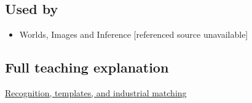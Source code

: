\subsection{Used by}\label{appendix-5fb4af80d1c7-used-by}

\begin{itemize}
\tightlist
\item
  {Worlds, Images and Inference {[}referenced source unavailable{]}}
\end{itemize}

\subsection{Full teaching explanation}\label{appendix-5fb4af80d1c7-full-teaching-explanation}

\hyperref[04-visual-computing-ii-ch030-recognition-templates-and-industrial-matching]{Recognition, templates, and industrial matching}
